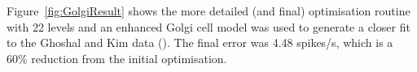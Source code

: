 Figure~\ref{fig:GolgiResult} shows the more detailed (and final) optimisation routine with
22 levels and an enhanced Golgi cell model was used to generate a closer fit to
the Ghoshal and Kim data ().  The final error was 4.48 spikes/s, which is a 60\%
reduction from the initial optimisation.















